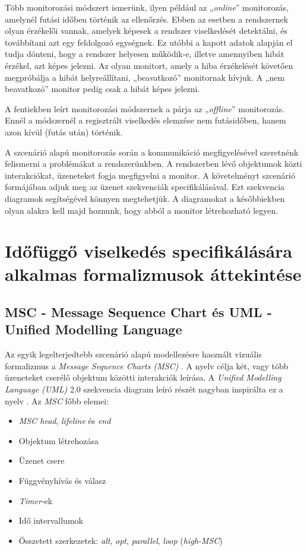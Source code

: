 Több monitorozási módszert ismerünk, ilyen például az „\textit{online}” \cite{RuntimeVerification1} monitorozás, amelynél futási időben történik az ellenőrzés.
Ebben az esetben a rendszernek olyan érzékelői vannak, amelyek képesek a rendszer viselkedését detektálni, és továbbítani azt egy feldolgozó egységnek.
Ez utóbbi a kapott adatok alapján el tudja dönteni, hogy a rendszer helyesen működik-e, illetve amennyiben hibát érzékel, azt képes jelezni.
Az olyan monitort, amely a hiba érzékelését követően megpróbálja a hibát helyreállítani, „beavatkozó” monitornak hívjuk.
A „nem beavatkozó” monitor pedig csak a hibát képes jelezni.

A fentiekben leírt monitorozási módszernek a párja az „\textit{offline}” \cite{RuntimeVerification1} monitorozás.
Ennél a módszernél a regisztrált viselkedés elemzése nem futásidőben, hanem azon kívül (futás után) történik.

A szcenárió alapú monitorozás során a kommunikáció megfigyelésével szeretnénk felismerni a problémákat a rendszerünkben.
A rendszerben lévő objektumok közti interakciókat, üzeneteket fogja megfigyelni a monitor.
A követelményt szcenárió formájában adjuk meg az üzenet szekvenciák specifikálásával.
Ezt szekvencia diagramok segítségével könnyen megtehetjük.
A diagramokat a későbbiekben olyan alakra kell majd hoznunk, hogy abból a monitor létrehozható legyen.

\section{Időfüggő viselkedés specifikálására alkalmas formalizmusok áttekintése}
\subsection{MSC - Message Sequence Chart és UML - Unified Modelling Language}

Az egyik legelterjedtebb szcenárió alapú modellezésre használt vizuális formalizmus a \textit{Message Sequence Charts (MSC)} \cite{MSC1}.
A nyelv célja két, vagy több üzeneteket cserélő objektum közötti interakciók leírása.
A \textit{Unified Modelling Language (UML)} 2.0 \cite{UML1} szekvencia diagram leíró részét nagyban inspirálta ez a nyelv \cite{MSC1}.
Az \textit{MSC} főbb elemei:

\begin{itemize}
\item \textit{MSC head}, \textit{lifeline} és \textit{end}
\item Objektum létrehozása
\item Üzenet csere
\item Függvényhívás és válasz
\item \textit{Timer}-ek
\item Idő intervallumok
\item Összetett szerkezetek: \textit{alt}, \textit{opt}, \textit{parallel}, \textit{loop} (\textit{high-MSC})
\end{itemize}

